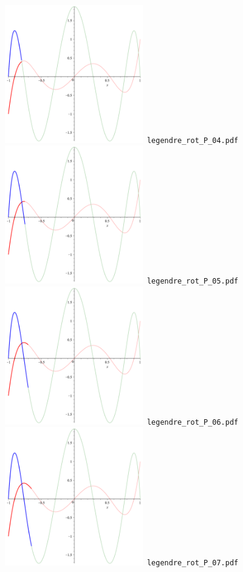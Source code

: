 \documentclass[a4paper]{amsart}
\begin{document}
\includegraphics[width=6cm]{legendre_rot_P_04.pdf}\verb+ legendre_rot_P_04.pdf+\\
\includegraphics[width=6cm]{legendre_rot_P_05.pdf}\verb+ legendre_rot_P_05.pdf+\\
\includegraphics[width=6cm]{legendre_rot_P_06.pdf}\verb+ legendre_rot_P_06.pdf+\\
\includegraphics[width=6cm]{legendre_rot_P_07.pdf}\verb+ legendre_rot_P_07.pdf+\\
\end{document}
